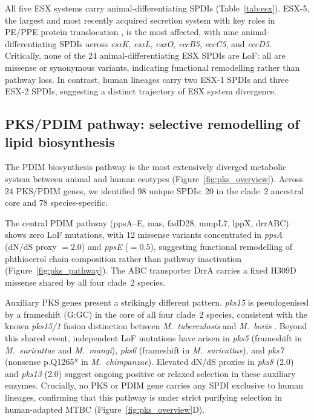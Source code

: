 \documentclass[11pt,a4paper]{article}
\newcommand{\Mtb}{\textit{M.~tuberculosis}}
\newcommand{\Msur}{\textit{M.~suricattae}}
\newcommand{\Mmun}{\textit{M.~mungi}}
\newcommand{\Mchi}{\textit{M.~chimpanzae}}
\begin{document}
All five ESX systems carry animal-differentiating SPDIs (Table~\ref{tab:esx}).
%
ESX-5, the largest and most recently acquired secretion system with key roles
in PE/PPE protein translocation \cite{Houben2012}, is the most affected, with
nine animal-differentiating SPDIs across \textit{esxK}, \textit{esxL}, \textit{esxO},
\textit{eccB5}, \textit{eccC5}, and \textit{eccD5}.
%
Critically, none of the 24 animal-differentiating ESX SPDIs are LoF: all are missense
or synonymous variants, indicating functional remodelling rather than pathway loss.
%
In contrast, human lineages carry two ESX-1 SPDIs and three ESX-2 SPDIs,
suggesting a distinct trajectory of ESX system divergence.

\subsection{PKS/PDIM pathway: selective remodelling of lipid biosynthesis}
\label{sec:results:pks}

The PDIM biosynthesis pathway is the most extensively diverged metabolic
system between animal and human ecotypes (Figure~\ref{fig:pks_overview}).
%
Across 24 PKS/PDIM genes, we identified 98 unique SPDIs: 20 in the
clade~2 ancestral core and 78 species-specific.

The central PDIM pathway (ppsA--E, mas, fadD28, mmpL7, lppX, drrABC)
shows zero LoF mutations, with 12 missense variants concentrated in \textit{ppsA}
(dN/dS proxy $= 2.0$) and \textit{ppsE} ($= 0.5$), suggesting functional
remodelling of phthiocerol chain composition rather than pathway inactivation
(Figure~\ref{fig:pks_pathway}).
%
The ABC transporter DrrA carries a fixed H309D missense shared by all four
clade~2 species.

Auxiliary PKS genes present a strikingly different pattern.
%
\textit{pks15} is pseudogenised by a frameshift (G:GC) in the core of all four
clade~2 species, consistent with the known \textit{pks15/1} fusion distinction
between \Mtb{} and \textit{M.~bovis} \cite{Reed2004}.
%
Beyond this shared event, independent LoF mutations have arisen in
\textit{pks5} (frameshift in \Msur{} and \Mmun{}),
\textit{pks6} (frameshift in \Msur{}), and
\textit{pks7} (nonsense p.Q1265* in \Mchi{}).
%
Elevated dN/dS proxies in \textit{pks8} (2.0) and \textit{pks13} (2.0)
suggest ongoing positive or relaxed selection in these auxiliary enzymes.
%
Crucially, no PKS or PDIM gene carries any SPDI exclusive to human lineages,
confirming that this pathway is under strict purifying selection in
human-adapted MTBC (Figure~\ref{fig:pks_overview}D).
\end{document}

